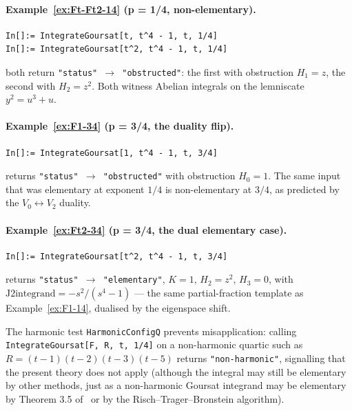 \documentclass[11pt,a4paper]{article}
\theoremstyle{plain}
\theoremstyle{definition}
\theoremstyle{remark}
\begin{document}
\paragraph{Example~\ref{ex:Ft-Ft2-14} (p = 1/4, non-elementary).}
\begin{lstlisting}[basicstyle=\footnotesize\ttfamily,frame=none]
In[]:= IntegrateGoursat[t, t^4 - 1, t, 1/4]
In[]:= IntegrateGoursat[t^2, t^4 - 1, t, 1/4]
\end{lstlisting}
both return \texttt{"status"\,$\to$\,"obstructed"}: the first with obstruction $H_1 = z$, the second with $H_2 = z^2$. Both witness Abelian integrals on the lemniscate $y^2 = u^3 + u$.

\paragraph{Example~\ref{ex:F1-34} (p = 3/4, the duality flip).}
\begin{lstlisting}[basicstyle=\footnotesize\ttfamily,frame=none]
In[]:= IntegrateGoursat[1, t^4 - 1, t, 3/4]
\end{lstlisting}
returns \texttt{"status"\,$\to$\,"obstructed"} with obstruction $H_0 = 1$. The same input that was elementary at exponent $1/4$ is non-elementary at $3/4$, as predicted by the $V_0 \leftrightarrow V_2$ duality.

\paragraph{Example~\ref{ex:Ft2-34} (p = 3/4, the dual elementary case).}
\begin{lstlisting}[basicstyle=\footnotesize\ttfamily,frame=none]
In[]:= IntegrateGoursat[t^2, t^4 - 1, t, 3/4]
\end{lstlisting}
returns \texttt{"status"\,$\to$\,"elementary"}, $K = 1$, $H_2 = z^2$, $H_3 = 0$, with $\text{J2integrand} = -s^2/(s^4-1)$ — the same partial-fraction template as Example~\ref{ex:F1-14}, dualised by the eigenspace shift.

\medskip
\noindent
The harmonic test \texttt{HarmonicConfigQ} prevents misapplication: calling \texttt{IntegrateGoursat[F, R, t, 1/4]} on a non-harmonic quartic such as $R = (t-1)(t-2)(t-3)(t-5)$ returns \texttt{"non-harmonic"}, signalling that the present theory does not apply (although the integral may still be elementary by other methods, just as a non-harmonic Goursat integrand may be elementary by Theorem 3.5 of~\cite{GoursatCubic} or by the Risch--Trager--Bronstein algorithm).
\end{document}
